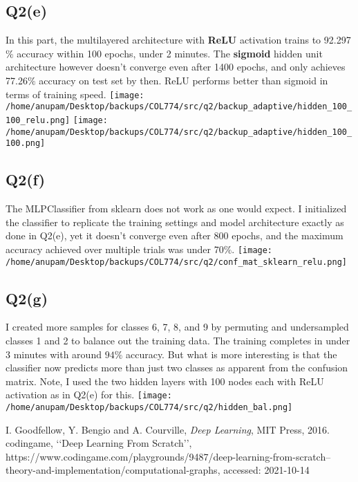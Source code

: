\documentclass[11pt]{article}
\begin{document}
\subsection{Q2(e)}
\label{sec-2-5}
In this part, the multilayered architecture with \textbf{ReLU}
activation trains to 92.297\(\%\) accuracy within 100 epochs, under 2
minutes. The \textbf{sigmoid} hidden unit architecture however doesn't
converge even after 1400 epochs, and only achieves 77.26\(\%\)
accuracy on test set by then. ReLU performs better than sigmoid in
terms of training speed.
\texttt{[image: /home/anupam/Desktop/backups/COL774/src/q2/backup\_adaptive/hidden\_100\_100\_relu.png]}
\texttt{[image: /home/anupam/Desktop/backups/COL774/src/q2/backup\_adaptive/hidden\_100\_100.png]}
\subsection{Q2(f)}
\label{sec-2-6}
The MLPClassifier from sklearn does not work as one would expect. I
initialized the classifier to replicate the training settings and
model architecture exactly as done in Q2(e), yet it doesn't converge
even after 800 epochs, and the maximum accuracy achieved over multiple
trials was under 70\(\%\).
\texttt{[image: /home/anupam/Desktop/backups/COL774/src/q2/conf\_mat\_sklearn\_relu.png]}
\subsection{Q2(g)}
\label{sec-2-7}
I created more samples for classes 6, 7, 8, and 9 by permuting and
undersampled classes 1 and 2 to balance out the training data. The
training completes in under 3 minutes with around \(94\%\)
accuracy. But what is more interesting is that the classifier now
predicts more than just two classes as apparent from the confusion
matrix. Note, I used the two hidden layers with 100 nodes each with
ReLU activation as in Q2(e) for this.
\texttt{[image: /home/anupam/Desktop/backups/COL774/src/q2/hidden\_bal.png]}


\begin{thebibliography}{9}
 I. Goodfellow, Y. Bengio and A. Courville, \emph{Deep Learning}, MIT Press, 2016.
 codingame, \lq\lq Deep Learning From Scratch\rq\rq, https://www.codingame.com/playgrounds/9487/deep-learning-from-scratch--theory-and-implementation/computational-graphs, accessed: 2021-10-14
\end{thebibliography}
\end{document}
